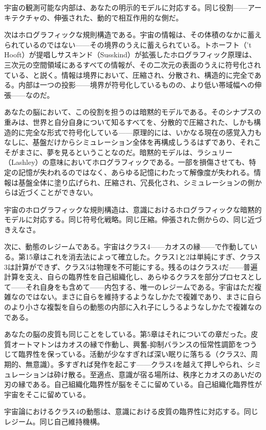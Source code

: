 \documentclass[11pt, twoside, openright]{book}
\begin{document}
宇宙の観測可能な内部は、あなたの明示的モデルに対応する。同じ役割------アーキテクチャの、伸張された、動的で相互作用的な側だ。

次はホログラフィックな規則構造である。宇宙の情報は、その体積のなかに蓄えられているのではない------その境界のうえに蓄えられている。トホーフト（'t Hooft）が提唱しサスキンド（Susskind）が拡張したホログラフィック原理は、三次元の空間領域にあるすべての情報が、その二次元の表面のうえに符号化されている、と説く。情報は境界において、圧縮され、分散され、構造的に完全である。内部は一つの投影------境界が符号化しているものの、より低い帯域幅への伸張------なのだ。

あなたの脳において、この役割を担うのは暗黙的モデルである。そのシナプスの重みは、世界と自分自身について知るすべてを、分散的で圧縮された、しかも構造的に完全な形式で符号化している------原理的には、いかなる現在の感覚入力もなしに、基盤だけからシミュレーション全体を再構成しうるはずであり、それこそがまさに、夢を見るということなのだ。暗黙的モデルは、ラシュリー（Lashley）の意味においてホログラフィックである。一部を損傷させても、特定の記憶が失われるのではなく、あらゆる記憶にわたって解像度が失われる。情報は基盤全体に塗り広げられ、圧縮され、冗長化され、シミュレーションの側からは近づくことができない。

宇宙のホログラフィックな規則構造は、意識におけるホログラフィックな暗黙的モデルに対応する。同じ符号化戦略。同じ圧縮。伸張された側からの、同じ近づきえなさ。

次に、動態のレジームである。宇宙はクラス4------カオスの縁------で作動している。第15章はこれを消去法によって確立した。クラス1と2は単純にすぎ、クラス3は計算ができず、クラス5は物理を不可能にする。残るのはクラス4だ------普遍計算を支え、自らの臨界性を自己組織化し、あらゆるクラスを部分プロセスとして------それ自身をも含めて------内包する、唯一のレジームである。宇宙はただ複雑なのではない。まさに自らを維持するようなしかたで複雑であり、まさに自らのより小さな複製を自らの動態の内部に入れ子にしうるようなしかたで複雑なのである。

あなたの脳の皮質も同じことをしている。第5章はそれについての章だった。皮質オートマトンはカオスの縁で作動し、興奮-抑制バランスの恒常性調節をつうじて臨界性を保っている。活動が少なすぎれば深い眠りに落ちる（クラス2、周期的、無意識）。多すぎれば発作を起こす------クラス4を越えて押しやられ、シミュレーションは砕け散る。至適点、意識が宿る場所は、秩序とカオスのあいだの刃の縁である。自己組織化臨界性が脳をそこに留めている。自己組織化臨界性が宇宙をそこに留めている。

宇宙論におけるクラス4の動態は、意識における皮質の臨界性に対応する。同じレジーム。同じ自己維持機構。
\end{document}
